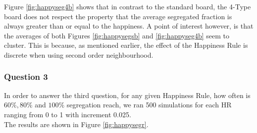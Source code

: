 Figure \ref{fig:happyseg4b} shows that in contrast to the standard board, the 4-Type board does not respect the property that the average segregated fraction is always greater than or equal to the happiness. 
A point of interest however, is that the averages of both Figures \ref{fig:happysegsb} and \ref{fig:happyseg4b} seem to cluster. 
This is because, as mentioned earlier, the effect of the Happiness Rule is discrete when using second order neighbourhood.

\subsubsection{Question 3}
In order to answer the third question, for any given Happiness Rule, how often is \(60\%,80\%\) and \(100\%\) segregation reach, we ran 500 simulations for each HR ranging from 0 to 1 with increment 0.025.\\
The results are shown in Figure \ref{fig:happysegr}.
